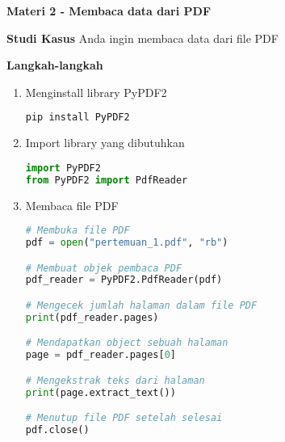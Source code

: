 \documentclass{article}
\begin{document}
    \begin{flushleft}
        \textbf{Materi 2 - Membaca data dari PDF}
        \newline

        \textbf{Studi Kasus}
        \newline
        Anda ingin membaca data dari file PDF
        \newline

        \textbf{Langkah-langkah}

        \begin{enumerate}
            \item Menginstall library PyPDF2
            \lstset{style=bashstyle}
            \begin{lstlisting}[language=bash]
pip install PyPDF2
            \end{lstlisting}

            \item Import library yang dibutuhkan
            \lstset{style=pythonstyle}
            \begin{lstlisting}[language=python]
import PyPDF2
from PyPDF2 import PdfReader
            \end{lstlisting}

            \item Membaca file PDF
            \lstset{style=pythonstyle}
            \begin{lstlisting}[language=python]
# Membuka file PDF
pdf = open("pertemuan_1.pdf", "rb")

# Membuat objek pembaca PDF
pdf_reader = PyPDF2.PdfReader(pdf)

# Mengecek jumlah halaman dalam file PDF
print(pdf_reader.pages)

# Mendapatkan object sebuah halaman
page = pdf_reader.pages[0]

# Mengekstrak teks dari halaman
print(page.extract_text())

# Menutup file PDF setelah selesai
pdf.close()
            \end{lstlisting}
        \end{enumerate}
    \end{flushleft}
\end{document}
